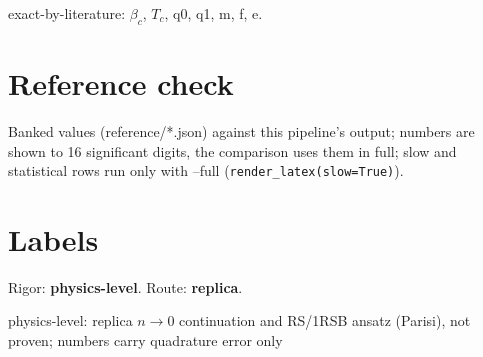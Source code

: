 \documentclass[11pt]{article}
\begin{document}
exact-by-literature: $\beta _{c}$, $T_{c}$, q0, q1, m, f, e.

\section{Reference check}
Banked values (reference/*.json) against this pipeline's output; numbers are shown to 16 significant digits, the comparison uses them in full; slow and statistical rows run only with --full (\texttt{render\_latex(slow=True)}).
\begin{center}\footnotesize
\setlength{\tabcolsep}{4pt}
\end{center}
\section{Labels}
Rigor: \textbf{physics-level}. Route: \textbf{replica}.

physics-level: replica $n \to 0$ continuation and RS/1RSB ansatz (Parisi), not proven; numbers carry quadrature error only
\end{document}
